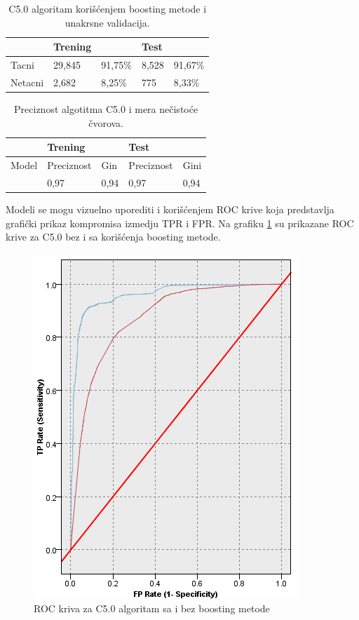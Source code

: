 \documentclass[a4paper]{article}
\begin{document}
\begin{table}[h!]
\begin{center}
\caption{C5.0 algoritam korišćenjem boosting metode i unakrsne validacija.}
\begin{tabular}{|l|l|l|l|l|} \hline
& Trening& & Test & \\ \hline
Tacni &29,845&91,75\%&8,528&91,67\%\\ \hline
Netacni&2,682 &8,25\%&775&8,33\%\\ \hline
\end{tabular}
\label{tab:tabelaC5Boosting}
\end{center}
\end{table}




\begin{table}[h!]
\begin{center}
\caption{Preciznost algotitma C5.0 i mera nečistoće čvorova.}
\begin{tabular}{|l|l|l|l|l|} \hline
& Trening& & Test & \\ \hline
Model &Preciznost&Gin&Preciznost&Gini\\ \hline
&0,97 &0,94&0,97&0,94\\ \hline
\end{tabular}
\label{tab:tabelaC5Bosting Preciznost}
\end{center}
\end{table}

Modeli se mogu vizuelno uporediti i korišćenjem ROC krive koja predstavlja grafički prikaz kompromisa izmedju TPR i FPR. Na grafiku \ref{fig:ROC} su prikazane  ROC krive za C5.0 bez i sa korišćenja boosting metode.



\begin{figure}[h!]
\begin{center}
    \includegraphics[scale=0.75]{ROC.PNG}
    \caption{ROC kriva za C5.0 algoritam sa i bez boosting metode}
    \label{fig:ROC}
\end{center}
\end{figure}
\end{document}
